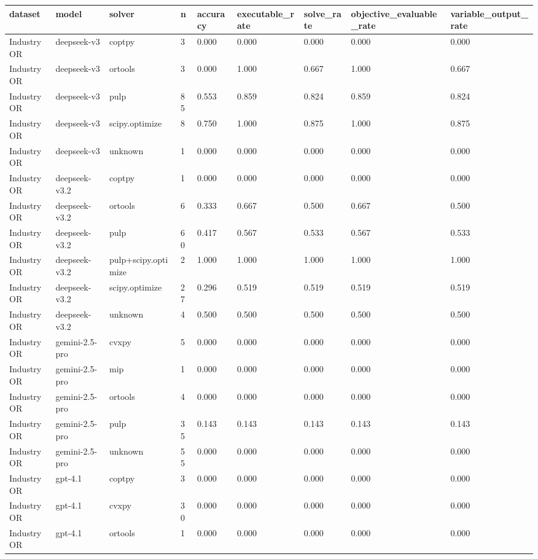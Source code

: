\begin{table}[t]
\centering
\small
\begin{tabular}{lllllllll}
\toprule
dataset & model & solver & n & accuracy & executable\_rate & solve\_rate & objective\_evaluable\_rate & variable\_output\_rate \\
\midrule
IndustryOR & deepseek-v3 & coptpy & 3 & 0.000 & 0.000 & 0.000 & 0.000 & 0.000 \\
IndustryOR & deepseek-v3 & ortools & 3 & 0.000 & 1.000 & 0.667 & 1.000 & 0.667 \\
IndustryOR & deepseek-v3 & pulp & 85 & 0.553 & 0.859 & 0.824 & 0.859 & 0.824 \\
IndustryOR & deepseek-v3 & scipy.optimize & 8 & 0.750 & 1.000 & 0.875 & 1.000 & 0.875 \\
IndustryOR & deepseek-v3 & unknown & 1 & 0.000 & 0.000 & 0.000 & 0.000 & 0.000 \\
IndustryOR & deepseek-v3.2 & coptpy & 1 & 0.000 & 0.000 & 0.000 & 0.000 & 0.000 \\
IndustryOR & deepseek-v3.2 & ortools & 6 & 0.333 & 0.667 & 0.500 & 0.667 & 0.500 \\
IndustryOR & deepseek-v3.2 & pulp & 60 & 0.417 & 0.567 & 0.533 & 0.567 & 0.533 \\
IndustryOR & deepseek-v3.2 & pulp+scipy.optimize & 2 & 1.000 & 1.000 & 1.000 & 1.000 & 1.000 \\
IndustryOR & deepseek-v3.2 & scipy.optimize & 27 & 0.296 & 0.519 & 0.519 & 0.519 & 0.519 \\
IndustryOR & deepseek-v3.2 & unknown & 4 & 0.500 & 0.500 & 0.500 & 0.500 & 0.500 \\
IndustryOR & gemini-2.5-pro & cvxpy & 5 & 0.000 & 0.000 & 0.000 & 0.000 & 0.000 \\
IndustryOR & gemini-2.5-pro & mip & 1 & 0.000 & 0.000 & 0.000 & 0.000 & 0.000 \\
IndustryOR & gemini-2.5-pro & ortools & 4 & 0.000 & 0.000 & 0.000 & 0.000 & 0.000 \\
IndustryOR & gemini-2.5-pro & pulp & 35 & 0.143 & 0.143 & 0.143 & 0.143 & 0.143 \\
IndustryOR & gemini-2.5-pro & unknown & 55 & 0.000 & 0.000 & 0.000 & 0.000 & 0.000 \\
IndustryOR & gpt-4.1 & coptpy & 3 & 0.000 & 0.000 & 0.000 & 0.000 & 0.000 \\
IndustryOR & gpt-4.1 & cvxpy & 30 & 0.000 & 0.000 & 0.000 & 0.000 & 0.000 \\
IndustryOR & gpt-4.1 & ortools & 1 & 0.000 & 0.000 & 0.000 & 0.000 & 0.000 \\

\end{tabular}
\end{table}
